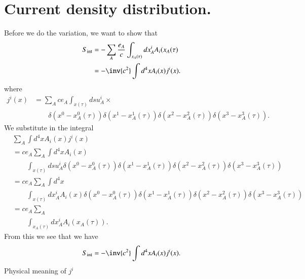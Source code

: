 \section{Current density distribution.}

Before we do the variation, we want to show that
%
\begin{equation}\label{eqn:relativisticElectrodynamicsL12b:590}
\begin{aligned}
S_{\text{int}}
&= -\sum_A \frac{e_A}{c} \int_{x_A(\tau)} dx^i_A A_i(x_A(\tau) \\
&= -\inv{c^2} \int d^4 x A_i(x) j^i(x).
\end{aligned}
\end{equation}
%
where
%
\begin{equation}\label{eqn:relativisticElectrodynamicsL12b:390}
\begin{aligned}
j^i(x) 
&=
\sum_A c e_A \int_{x(\tau)}
ds u^i_A \times \\
&\qquad \delta(x^0 - x^0_A(\tau))
\delta(x^1 - x^1_A(\tau))
\delta(x^2 - x^2_A(\tau))
\delta(x^3 - x^3_A(\tau)).
\end{aligned}
\end{equation}
%
We substitute in the integral
%
\begin{equation}\label{eqn:relativisticElectrodynamicsL12b:610}
\begin{aligned}
&\sum_A \int d^4 x A_i(x) j^i(x) \\
&=
c e_A \sum_A \int d^4 x A_i(x) \\
&\qquad \int_{x(\tau)}
ds u^i_A
\delta(x^0 - x^0_A(\tau))
\delta(x^1 - x^1_A(\tau))
\delta(x^2 - x^2_A(\tau))
\delta(x^3 - x^3_A(\tau)) \\
&=
c e_A \sum_A
\int d^4 x \\
&\qquad \int_{x(\tau)}
dx^i_A
A_i(x)
\delta(x^0 - x^0_A(\tau))
\delta(x^1 - x^1_A(\tau))
\delta(x^2 - x^2_A(\tau))
\delta(x^3 - x^3_A(\tau)) \\
&=
c e_A \sum_A \\
&\qquad \int_{x_A(\tau)}
dx^i_A
A_i(x_A(\tau)).
\end{aligned}
\end{equation}
%
From this we see that we have
%
\begin{equation}\label{eqn:relativisticElectrodynamicsL12b:430}
S_{\text{int}} = -\inv{c^2} \int d^4 x A_i(x) j^i(x).
\end{equation}
%
Physical meaning of \(j^i\)

